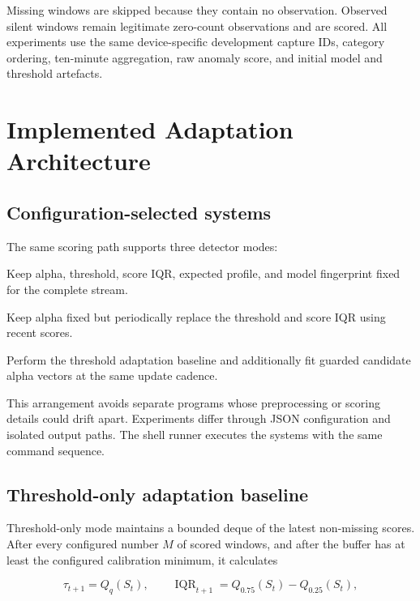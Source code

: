 \documentclass[11pt,a4paper]{article}
\begin{document}
Missing windows are skipped because they contain no observation. Observed
silent windows remain legitimate zero-count observations and are scored. All
experiments use the same device-specific development capture IDs, category
ordering, ten-minute aggregation, raw anomaly score, and initial model and
threshold artefacts.

\section{Implemented Adaptation Architecture}

\subsection{Configuration-selected systems}

The same scoring path supports three detector modes:

\begin{description}[style=nextline,leftmargin=3.8cm,labelwidth=3.5cm]
  \item[\texttt{static}] Keep alpha, threshold, score IQR, expected profile,
  and model fingerprint fixed for the complete stream.
  \item[\texttt{adaptive\_threshold}] Keep alpha fixed but periodically
  replace the threshold and score IQR using recent scores.
  \item[\texttt{periodic\_refit}] Perform the threshold adaptation baseline
  and additionally fit guarded candidate alpha vectors at the same update
  cadence.
\end{description}

This arrangement avoids separate programs whose preprocessing or scoring
details could drift apart. Experiments differ through JSON configuration and
isolated output paths. The shell runner executes the systems with the same
command sequence.

\subsection{Threshold-only adaptation baseline}

Threshold-only mode maintains a bounded deque of the latest non-missing
scores. After every configured number $M$ of scored windows, and after the
buffer has at least the configured calibration minimum, it calculates

\[
\tau_{t+1}=Q_q(S_t),
\qquad
\operatorname{IQR}_{t+1}=Q_{0.75}(S_t)-Q_{0.25}(S_t),
\]
\end{document}
